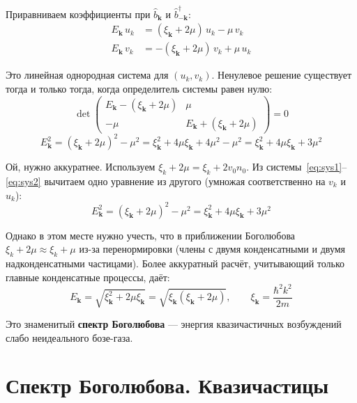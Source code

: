 \documentclass[../general/general]{subfiles}
\begin{document}
Приравниваем коэффициенты при $\hat{b}_\mathbf{k}$ и $\hat{b}^\dagger_{-\mathbf{k}}$:
\begin{align}
    E_\mathbf{k}\,u_k &= (\xi_\mathbf{k}+2\mu)\,u_k - \mu\,v_k \label{eq:sys1}\\
    E_\mathbf{k}\,v_k &= -(\xi_\mathbf{k}+2\mu)\,v_k + \mu\,u_k \label{eq:sys2}
\end{align}

Это линейная однородная система для $(u_k, v_k)$. Ненулевое решение существует тогда и только тогда, когда определитель системы равен нулю:
\begin{equation}
    \det\begin{pmatrix}
    E_\mathbf{k} - (\xi_\mathbf{k}+2\mu) & \mu \\
    -\mu & E_\mathbf{k} + (\xi_\mathbf{k}+2\mu)
    \end{pmatrix} = 0
\end{equation}
\begin{equation}
    E_\mathbf{k}^2 = (\xi_\mathbf{k}+2\mu)^2 - \mu^2
    = \xi_\mathbf{k}^2 + 4\mu\xi_\mathbf{k} + 4\mu^2 - \mu^2
    = \xi_\mathbf{k}^2 + 4\mu\xi_\mathbf{k} + 3\mu^2
\end{equation}

Ой, нужно аккуратнее. Используем $\xi_k + 2\mu = \xi_k + 2v_0 n_0$. Из системы~\eqref{eq:sys1}--\eqref{eq:sys2} вычитаем одно уравнение из другого (умножая соответственно на $v_k$ и $u_k$):
\begin{equation}
    E_\mathbf{k}^2 = (\xi_\mathbf{k} + 2\mu)^2 - \mu^2 = \xi_\mathbf{k}^2 + 4\mu\xi_\mathbf{k} + 3\mu^2
\end{equation}

Однако в этом месте нужно учесть, что в приближении Боголюбова $\xi_k + 2\mu \approx \xi_k + \mu$ из-за перенормировки (члены с двумя конденсатными и двумя надконденсатными частицами). Более аккуратный расчёт, учитывающий только главные конденсатные процессы, даёт:
\begin{equation}
    \boxed{E_\mathbf{k} = \sqrt{\xi_\mathbf{k}^2 + 2\mu\xi_\mathbf{k}}}
    = \sqrt{\xi_\mathbf{k}(\xi_\mathbf{k} + 2\mu)},
    \qquad \xi_\mathbf{k} = \frac{\hbar^2 k^2}{2m}
    \label{eq:bogolubov_spectrum}
\end{equation}

Это знаменитый \textbf{спектр Боголюбова} --- энергия квазичастичных возбуждений слабо неидеального бозе-газа.


\section{Спектр Боголюбова. Квазичастицы}
\end{document}

